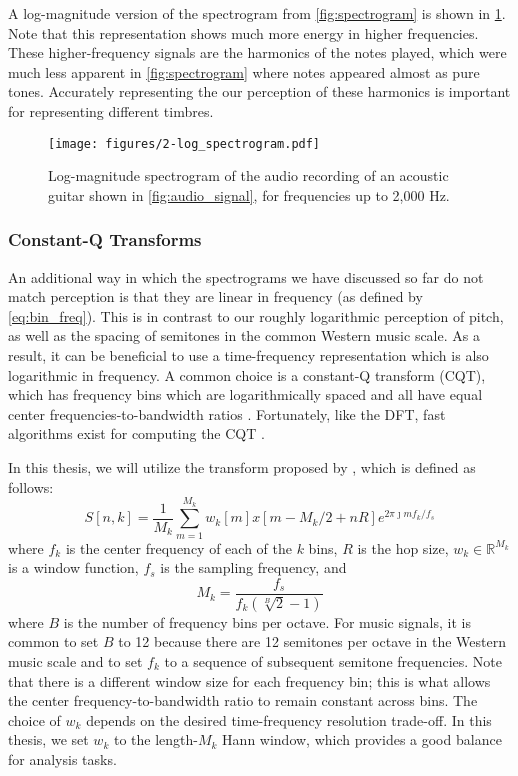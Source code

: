 A log-magnitude version of the spectrogram from \cref{fig:spectrogram} is shown in \cref{fig:log_spectrogram}.
Note that this representation shows much more energy in higher frequencies.
These higher-frequency signals are the harmonics of the notes played, which were much less apparent in \cref{fig:spectrogram} where notes appeared almost as pure tones.
Accurately representing the our perception of these harmonics is important for representing different timbres.

\begin{figure}
  \centering
  \texttt{[image: figures/2-log\_spectrogram.pdf]}
  \caption[Log-magnitude spectrogram of the acoustic guitar recording]{Log-magnitude spectrogram of the audio recording of an acoustic guitar shown in \cref{fig:audio_signal}, for frequencies up to 2,000 Hz.}
  \label{fig:log_spectrogram}
\end{figure}

\subsubsection{Constant-Q Transforms}

An additional way in which the spectrograms we have discussed so far do not match perception is that they are linear in frequency (as defined by \cref{eq:bin_freq}).
This is in contrast to our roughly logarithmic perception of pitch, as well as the spacing of semitones in the common Western music scale.
As a result, it can be beneficial to use a time-frequency representation which is also logarithmic in frequency.
A common choice is a constant-Q transform (CQT), which has frequency bins which are logarithmically spaced and all have equal center frequencies-to-bandwidth ratios \cite{brown1991calculation}.
Fortunately, like the DFT, fast algorithms exist for computing the CQT \cite{brown1992efficient,schorkhuber2010constant}.

In this thesis, we will utilize the transform proposed by \cite{schorkhuber2010constant}, which is defined as follows:
\begin{equation}
        S[n, k] = \frac{1}{M_k} \sum_{m = 1}^{M_k} w_k[m]x[m - M_k/2 + nR] e^{2\pi \jmath m f_k/f_s}
\end{equation}
where $f_k$ is the center frequency of each of the $k$ bins, $R$ is the hop size, $w_k \in \mathbb{R}^{M_k}$ is a window function, $f_s$ is the sampling frequency, and
\begin{equation}
        M_k = \frac{f_s}{f_k (\sqrt[B]{2} - 1)}
\end{equation}
where $B$ is the number of frequency bins per octave.
For music signals, it is common to set $B$ to 12 because there are 12 semitones per octave in the Western music scale and to set $f_k$ to a sequence of subsequent semitone frequencies.
Note that there is a different window size for each frequency bin; this is what allows the center frequency-to-bandwidth ratio to remain constant across bins.
The choice of $w_k$ depends on the desired time-frequency resolution trade-off.
In this thesis, we set $w_k$ to the length-$M_k$ Hann window, which provides a good balance for analysis tasks.

